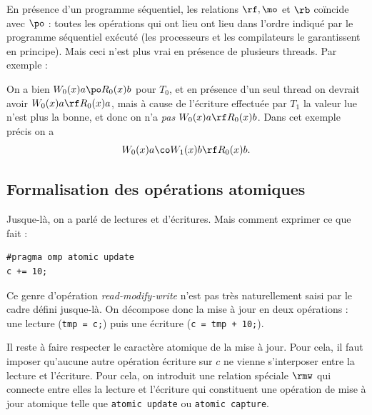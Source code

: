 En présence d'un programme séquentiel, les relations $\rf, \mo$ et $\rb$
coïncide avec $\po$ : toutes les opérations qui ont lieu ont lieu dans l'ordre
indiqué par le programme séquentiel exécuté (les processeurs et les compilateurs
le garantissent en principe). Mais ceci n'est plus vrai en présence de plusieurs
threads. Par exemple :

\begin{center}
\end{center}

On a bien $W_0(x)a \po R_0(x)b$ pour $T_0$, et en présence d'un seul thread on
devrait avoir $W_0(x)a \rf R_0(x)a$, mais à cause de l'écriture effectuée par
$T_1$ la valeur lue n'est plus la bonne, et donc on n'a \emph{pas}
$W_0(x)a \rf R_0(x)b$. Dans cet exemple précis on a
\[
  W_0(x)a \co W_1(x)b \rf R_0(x)b.
\]


\subsection{Formalisation des opérations atomiques}

Jusque-là, on a parlé de lectures et d'écritures. Mais comment exprimer ce que
fait :
\begin{myfilet}
  \begin{verbatim}
#pragma omp atomic update
c += 10;
\end{verbatim}
\end{myfilet}
Ce genre d'opération \emph{read-modify-write} n'est pas très naturellement saisi
par le cadre défini jusque-là. On décompose donc la mise à jour en deux opérations :
une lecture (\texttt{tmp = c;}) puis une écriture (\texttt{c = tmp + 10;}).

Il reste à faire respecter le caractère atomique de la mise à jour. Pour cela,
il faut imposer qu'aucune autre opération écriture sur $c$ ne vienne
s'interposer entre la lecture et l'écriture. Pour cela, on introduit une
relation spéciale $\rmw$ qui connecte entre elles la lecture et l'écriture qui
constituent une opération de mise à jour atomique telle que \texttt{atomic
  update} ou \texttt{atomic capture}.


